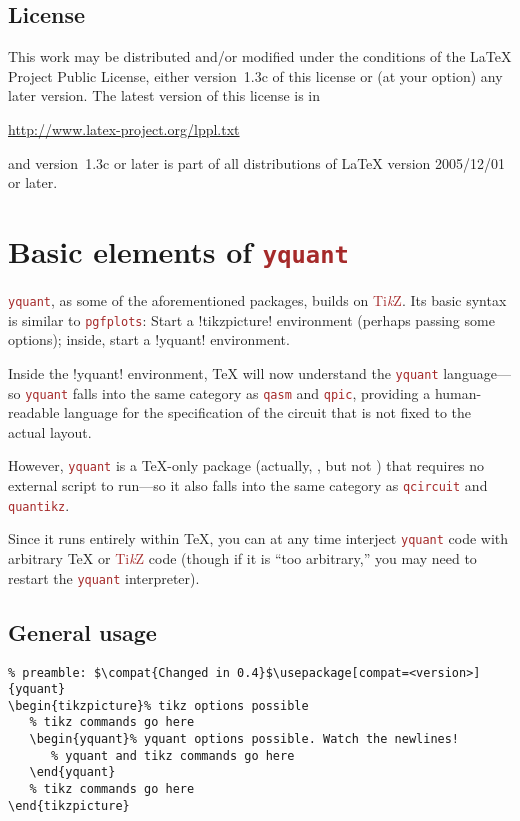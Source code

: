 \documentclass{scrartcl}
\makeatletter
\def\TikZ{\textcolor{brown}{Ti\textit kZ}}
\def\pkg#1{\textcolor{brown}{\texttt{#1}}}
\def\Yquant{\pkg{yquant}}
\newcommand*{\the@orig@section}{}
\let\the@orig@section=\section
\renewcommand*{\section}{%
   \clearpage%
   \the@orig@section%
}
\makeatother
\begin{document}
      \subsection{License}
          This work may be distributed and/or modified under the conditions of the \LaTeX{} Project Public License, either version~1.3c of this license or (at your option) any later version.
          The latest version of this license is in
          \begin{center}
             \url{http://www.latex-project.org/lppl.txt}
          \end{center}
          and version~1.3c or later is part of all distributions of LaTeX version 2005/12/01 or later.

   \section{Basic elements of \Yquant}\label{sec:grammar}
      \Yquant, as some of the aforementioned packages, builds on \TikZ.
      Its basic syntax is similar to \pkg{pgfplots}: Start a \tex!tikzpicture! environment (perhaps passing some options); inside, start a \tex!yquant! environment.

      Inside the \tex!yquant! environment, \TeX{} will now understand the \Yquant{} language---so \Yquant{} falls into the same category as \pkg{qasm} and \pkg{qpic}, providing a human\hyp readable language for the specification of the circuit that is not fixed to the actual layout.

      However, \Yquant{} is a \TeX\hyp only package (actually, , but not ) that requires no external script to run---so it also falls into the same category as \pkg{qcircuit} and \pkg{quantikz}.

      Since it runs entirely within \TeX, you can at any time interject \Yquant{} code with arbitrary \TeX{} or \TikZ{} code (though if it is ``too arbitrary,'' you may need to restart the \Yquant{} interpreter).

      \subsection{General usage}
         \begin{verbatim}
% preamble: $\compat{Changed in 0.4}$\usepackage[compat=<version>]{yquant}
\begin{tikzpicture}% tikz options possible
   % tikz commands go here
   \begin{yquant}% yquant options possible. Watch the newlines!
      % yquant and tikz commands go here
   \end{yquant}
   % tikz commands go here
\end{tikzpicture}
         \end{verbatim}
\end{document}
